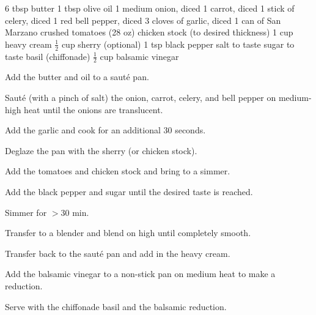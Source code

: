 \dishtype{\soup}
\dishtype{}
\begin{ingreds}
    6 tbsp butter
    1 tbsp olive oil
    1 medium onion, diced
    1 carrot, diced
    1 stick of celery, diced
    1 red bell pepper, diced
    3 cloves of garlic, diced
    1 can of San Marzano crushed tomatoes (28 oz)
    chicken stock (to desired thickness)
    1 cup heavy cream
    $\frac{1}{2}$ cup sherry (optional)
    1 tsp black pepper
    salt to taste
    sugar to taste
    basil (chiffonade)
    $\frac{1}{2}$ cup balsamic vinegar   
\end{ingreds}
\begin{method}
    Add the butter and oil to a saut\'e pan.\par
    Saut\'e (with a pinch of salt) the onion, carrot, celery, and bell pepper on medium-high heat until the onions are translucent.\par
    Add the garlic and cook for an additional 30 seconds.\par
    Deglaze the pan with the sherry (or chicken stock).\par
    Add the tomatoes and chicken stock and bring to a simmer.\par
    Add the black pepper and sugar until the desired taste is reached.\par
    Simmer for $>$30 min.\par
    Transfer to a blender and blend on high until completely \linebreak smooth.\par
    Transfer back to the saut\'e pan and add in the heavy cream.\par
    Add the balsamic vinegar to a non-stick pan on medium heat to make a reduction.\par
    Serve with the chiffonade basil and the balsamic reduction.
\end{method}
